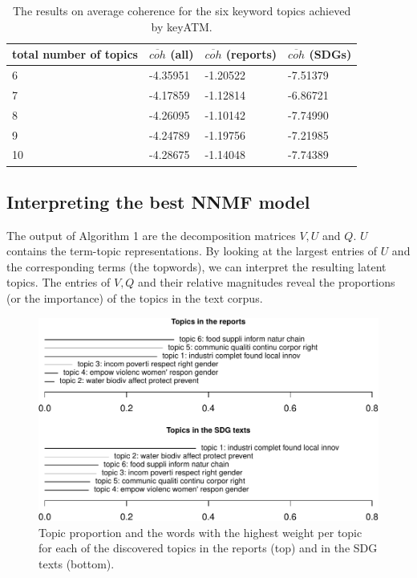 \documentclass[
]{article}
\begin{document}
\begin{table}

\caption{\label{tab:tabrcoh}The results on average coherence for the six keyword topics achieved by keyATM.}
\centering
\begin{tabular}[t]{l|l|l|l}
\hline
total number of topics & $\overline{coh}$ (all) & $\overline{coh}$ (reports) & $\overline{coh}$ (SDGs)\\
\hline
6 & -4.35951 & -1.20522 & -7.51379\\
\hline
7 & -4.17859 & -1.12814 & -6.86721\\
\hline
8 & -4.26095 & -1.10142 & -7.74990\\
\hline
9 & -4.24789 & -1.19756 & -7.21985\\
\hline
10 & -4.28675 & -1.14048 & -7.74389\\
\hline
\end{tabular}
\end{table}

\hypertarget{interpreting-the-best-nnmf-model}{%
\subsection{Interpreting the best NNMF model}\label{interpreting-the-best-nnmf-model}}

The output of Algorithm 1 are the decomposition matrices \(V,U\) and \(Q\). \(U\) contains the term-topic representations. By looking at the largest entries of \(U\) and the corresponding terms (the topwords), we can interpret the resulting latent topics. The entries of \(V,Q\) and their relative magnitudes reveal the proportions (or the importance) of the topics in the text corpus.

\begin{figure}
\includegraphics[width=0.8\linewidth]{20240606_sustain_dim_files/figure-latex/figtpropg-1} \caption{Topic proportion and the words with the highest weight per topic for each of the discovered topics in the reports (top) and in the SDG texts (bottom).}\label{fig:figtpropg}
\end{figure}
\end{document}
